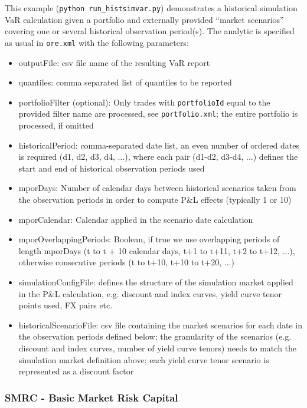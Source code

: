 This example ({\tt python run\_histsimvar.py}) demonstrates a historical simulation VaR calculation
given a portfolio and externally provided ``market scenarios'' covering
one or several historical observation period(s).
The analytic is specified as usual in {\tt ore.xml} with the following parameters:
\begin{itemize}
\item outputFile: csv file name of the resulting VaR report 
\item quantiles: comma separated list of quantiles to be reported
\item portfolioFilter (optional): Only trades with {\tt portfolioId} equal to the provided filter name are processed, see {\tt portfolio.xml}; the entire portfolio is processed, if omitted
\item historicalPeriod: comma-separated date list, an even number of ordered dates is required (d1, d2, d3, d4, ...), where each pair (d1-d2, d3-d4, ...) defines the start and end of historical observation periods used
\item mporDays: Number of calendar days between historical scenarios taken from the observation periods in order to compute P\&L effects (typically 1 or 10) 
\item mporCalendar: Calendar applied in the scenario date calculation
\item mporOverlappingPeriods: Boolean, if true we use overlapping periods of length mporDays (t to t + 10 calendar days, t+1 to t+11, t+2 to t+12, ...), otherwise consecutive periods (t to t+10, t+10 to t+20, ...)
\item simulationConfigFile: defines the structure of the simulation market applied in the P\&L calculation, e.g. discount and index curves, yield curve tenor points used, FX pairs etc.
\item historicalScenarioFile: csv file containing the market scenarios for each date in the observation periods defined below; the granularity of the scenarios (e.g. discount and index curves, number of yield curve tenors) needs to match the simulation market definition above; each yield curve tenor scenario is represented as a discount factor 
\end{itemize}

\subsubsection{SMRC - Basic Market Risk Capital}

